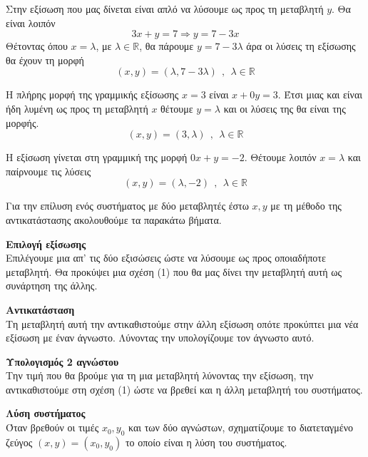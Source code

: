\begin{alist}
\item Στην εξίσωση που μας δίνεται είναι απλό να λύσουμε ως προς τη μεταβλητή $ y $. Θα είναι λοιπόν
\[ 3x+y=7\Rightarrow y=7-3x \]
Θέτοντας όπου $ x=\lambda $, με $ \lambda\in\mathbb{R} $, θα πάρουμε $ y=7-3\lambda $ άρα οι λύσεις τη εξίσωσης θα έχουν τη μορφή
\[ (x,y)=(\lambda,7-3\lambda)\ \ ,\ \ \lambda\in\mathbb{R} \]
\item Η πλήρης μορφή της γραμμικής εξίσωσης $ x=3 $ είναι $ x+0y=3 $. Έτσι μιας και είναι ήδη λυμένη ως προς τη μεταβλητή $ x $ θέτουμε $ y=\lambda $ και οι λύσεις της θα είναι της μορφής.
\[ (x,y)=(3,\lambda) \ \ ,\ \ \lambda\in\mathbb{R} \]
\item Η εξίσωση γίνεται στη γραμμική της μορφή $ 0x+y=-2 $. Θέτουμε λοιπόν $ x=\lambda $ και παίρνουμε τις λύσεις
\[ (x,y)=(\lambda,-2)\ \ ,\ \ \lambda\in\mathbb{R} \]
\end{alist}
\begin{Methodos}{4cm}
Για την επίλυση ενός συστήματος με δύο μεταβλητές έστω $ x,y $ με τη μέθοδο της αντικατάστασης ακολουθούμε τα παρακάτω βήματα.
\begin{bhma}
\item \textbf{Επιλογή εξίσωσης}\\
Επιλέγουμε μια απ' τις δύο εξισώσεις ώστε να λύσουμε ως προς οποιαδήποτε μεταβλητή. Θα προκύψει μια σχέση (1) που θα μας δίνει την μεταβλητή αυτή ως συνάρτηση της άλλης. 
\item \textbf{Αντικατάσταση}\\
Τη μεταβλητή αυτή την αντικαθιστούμε στην άλλη εξίσωση οπότε προκύπτει μια νέα εξίσωση με έναν άγνωστο. Λύνοντας την υπολογίζουμε τον άγνωστο αυτό.
\item \textbf{Υπολογισμός 2 αγνώστου}\\
Την τιμή που θα βρούμε για τη μια μεταβλητή λύνοντας την εξίσωση, την αντικαθιστούμε στη σχέση (1) ώστε να βρεθεί και η άλλη μεταβλητή του συστήματος.
\item \textbf{Λύση συστήματος}\\
Όταν βρεθούν οι τιμές $ x_0,y_0 $ και των δύο αγνώστων, σχηματίζουμε το διατεταγμένο ζεύγος $ (x,y)=(x_0,y_0) $ το οποίο είναι η λύση του συστήματος.
\end{bhma}
\end{Methodos}
\lysh\\
